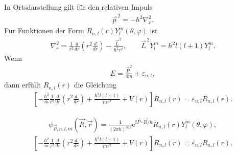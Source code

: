 \documentclass[11pt,a4paper]{scrartcl}
\newcommand{\e}{\mathrm e}
\newcommand{\ii}{\mathrm i}
\newcommand{\eps}{\varepsilon}
\begin{document}
\begin{enumerate}[label=(\alph*)]
\begin{calculationbox}
            \begin{calculationbox}[title=Radialgleichung]
                In Ortsdarstellung gilt für den relativen Impuls
                \begin{align*}
                    \vec p^{\,2}=-\hbar^2\nabla_r^2.
                \end{align*}
                Für Funktionen der Form $R_{n,l}(r)Y_l^m(\theta,\varphi)$ ist
                \begin{align*}
                    \nabla_r^2
                    =
                    \frac{1}{r^2}\frac{d}{dr}\left(r^2\frac{d}{dr}\right)
                    -
                    \frac{\vec L^{\,2}}{\hbar^2r^2},
                    \qquad
                    \vec L^{\,2}Y_l^m=\hbar^2l(l+1)Y_l^m.
                \end{align*}
                Wenn
                \begin{align*}
                    E=\frac{\vec P^{\,2}}{4m}+\eps_{n,l},
                \end{align*}
                dann erfüllt $R_{n,l}(r)$ die Gleichung
                \begin{align*}
                    \left[
                        -\frac{\hbar^2}{m}
                        \frac{1}{r^2}\frac{d}{dr}\left(r^2\frac{d}{dr}\right)
                        +
                        \frac{\hbar^2l(l+1)}{mr^2}
                        +
                        V(r)
                    \right]
                    R_{n,l}(r)
                    =
                    \eps_{n,l}R_{n,l}(r).
                \end{align*}

                \begin{solutionbox}[title=Eigenfunktionen und Radialgleichung]
                    \begin{align*}
                        \psi_{\vec P,n,l,m}(\vec R,\vec r)
                        =
                        \frac{1}{(2\pi\hbar)^{3/2}}
                        \e^{\ii\vec P\cdot\vec R/\hbar}
                        R_{n,l}(r)Y_l^m(\theta,\varphi),
                    \end{align*}
                    \begin{align*}
                        \left[
                            -\frac{\hbar^2}{m}
                            \frac{1}{r^2}\frac{d}{dr}\left(r^2\frac{d}{dr}\right)
                            +
                            \frac{\hbar^2l(l+1)}{mr^2}
                            +
                            V(r)
                        \right]
                        R_{n,l}(r)=\eps_{n,l}R_{n,l}(r).
                    \end{align*}
                \end{solutionbox}
            \end{calculationbox}
        \end{calculationbox}


\end{enumerate}
\end{document}
